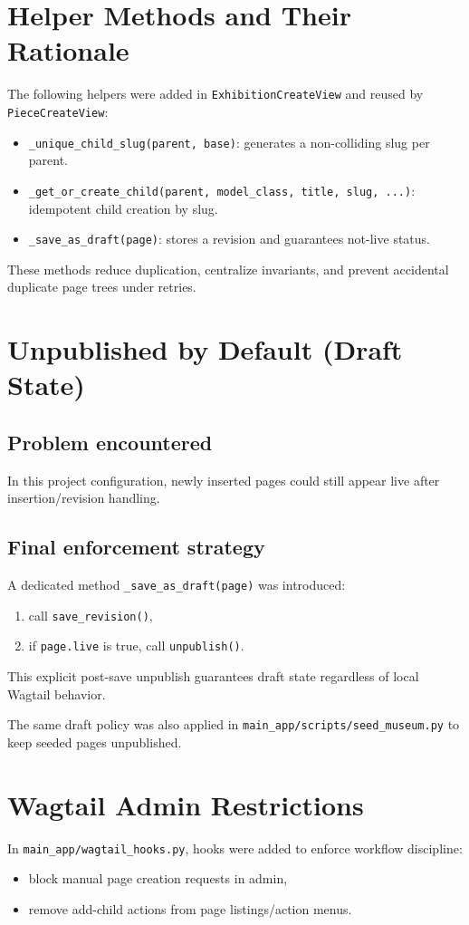 \documentclass[11pt,a4paper]{article}
\begin{document}
\section{Helper Methods and Their Rationale}
The following helpers were added in \texttt{ExhibitionCreateView} and reused by \texttt{PieceCreateView}:
\begin{itemize}[leftmargin=*]
    \item \texttt{\_unique\_child\_slug(parent, base)}: generates a non-colliding slug per parent.
    \item \texttt{\_get\_or\_create\_child(parent, model\_class, title, slug, ...)}: idempotent child creation by slug.
    \item \texttt{\_save\_as\_draft(page)}: stores a revision and guarantees not-live status.
\end{itemize}

These methods reduce duplication, centralize invariants, and prevent accidental duplicate page trees under retries.

\section{Unpublished by Default (Draft State)}
\subsection{Problem encountered}
In this project configuration, newly inserted pages could still appear live after insertion/revision handling.

\subsection{Final enforcement strategy}
A dedicated method \texttt{\_save\_as\_draft(page)} was introduced:
\begin{enumerate}[leftmargin=*]
    \item call \texttt{save\_revision()},
    \item if \texttt{page.live} is true, call \texttt{unpublish()}.
\end{enumerate}
This explicit post-save unpublish guarantees draft state regardless of local Wagtail behavior.

The same draft policy was also applied in \texttt{main\_app/scripts/seed\_museum.py} to keep seeded pages unpublished.

\section{Wagtail Admin Restrictions}
In \texttt{main\_app/wagtail\_hooks.py}, hooks were added to enforce workflow discipline:
\begin{itemize}[leftmargin=*]
    \item block manual page creation requests in admin,
    \item remove add-child actions from page listings/action menus.
\end{itemize}
\end{document}
